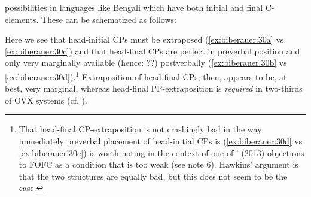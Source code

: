 \documentclass[output=paper]{LSP/langsci}
\begin{document}
possibilities in languages like Bengali which have both initial and final C-elements. These can be schematized as follows:

\ea\label{ex:biberauer:30}   
\z
\z

Here we see that head-initial CPs must be extraposed (\ref{ex:biberauer:30a} vs \ref{ex:biberauer:30c}) and that head-final CPs are perfect in preverbal position and only very marginally available (hence: ??) postverbally (\ref{ex:biberauer:30b} vs \ref{ex:biberauer:30d}).\footnote{\label{fn:biberauer:30} That head-final CP-extraposition is not crashingly bad in the way immediately preverbal placement of head-initial CPs is (\ref{ex:biberauer:30d} vs \ref{ex:biberauer:30c}) is worth noting in the context of one of \citeauthor{Hawkins2013}’ (2013) objections to FOFC as a condition that is too weak (see note 6). Hawkins’ argument is that the two structures are equally bad, but this does not seem to be the case.}  Extraposition of head-final CPs, then, appears to be, at best, very marginal, whereas head-final PP-extraposition is \textit{required} in two-thirds of OVX systems (cf. ). 
\end{document}
